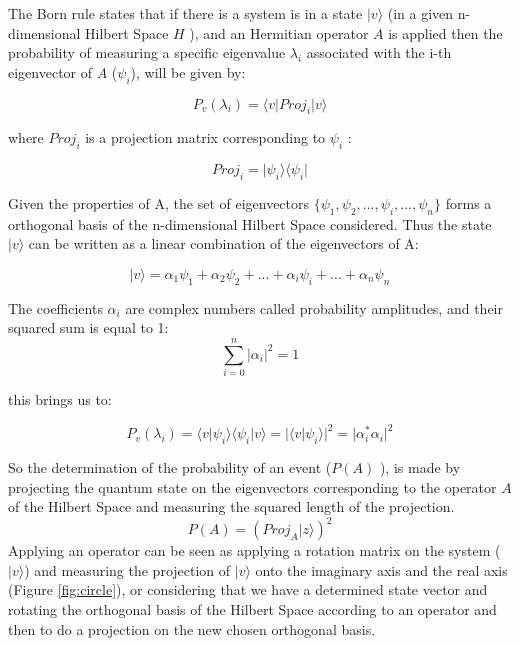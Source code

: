 The Born rule states that if there is a system is in a state $\vert v \rangle$  (in a given n-dimensional Hilbert Space $H$ ), and an Hermitian operator $A$ is applied then the probability of measuring a specific eigenvalue $\lambda_{i}$ associated with the i-th eigenvector of $A$ ($\psi_{i}$), will be given by\cite{VanRijsbergen2004}: 


\begin{equation}
\label{eq_born_rule}
P_{v}(\lambda_{i}) = \langle v\vert Proj_{i}\vert v\rangle
\end{equation}

where $Proj_{i}$ is a projection matrix corresponding to $\psi_{i}$ :

 \begin{equation}
\label{eq_born_rule_1}
Proj_{i} = \vert\psi_{i}\rangle \langle \psi_{i}\vert
\end{equation}

Given the properties of A, the set of eigenvectors $\{ \psi_{1}, \psi_{2}, ..., \psi_{i},..., \psi_{n}\}$ forms a orthogonal basis of the n-dimensional Hilbert Space considered. Thus the state $\vert v \rangle$
can be written as a linear combination of the eigenvectors of A:

 \begin{equation}
\label{eq_born_rule_lala}
\vert v \rangle = \alpha_{1}\psi_{1}+ \alpha_{2}\psi_{2}+ ...+\alpha_{i}\psi_{i}+...+\alpha_{n}\psi_{n}
\end{equation}

The coefficients $\alpha_{i}$ are complex numbers called probability amplitudes, and their squared sum is equal to 1: 
\begin{equation}
\sum_{i=0}^{n} \vert \alpha_{i}\vert^{2} = 1
\end{equation}

this brings us to: 

\begin{equation}
\label{eq_born_rule_2}
P_{v}(\lambda_{i}) =\langle v\vert\psi_{i}\rangle\langle\psi_{i}\vert v\rangle=\vert\langle v\vert\psi_{i}\rangle \vert^{2} = \vert \alpha_{i}^{*}\alpha_{i}\vert^{2}
\end{equation}

So the determination of the probability of an event ($P(A)$ ),
is made by projecting the quantum state on the eigenvectors corresponding to the operator $A$ of the
Hilbert Space and measuring the squared length of the projection.\cite{Trueblood}
\begin{equation}
P(A)=\left(Proj_{A}\vert z\rangle\right)^{2}
\end{equation}
Applying an operator can be seen as applying a rotation matrix on the system ($\vert v \rangle$) and measuring the projection of $\vert v \rangle$ onto the imaginary axis and the real axis (Figure \ref{fig:circle}), or considering that we have a determined state vector and rotating the orthogonal basis of the Hilbert Space according to an operator and then to do a projection on the new chosen orthogonal basis.


